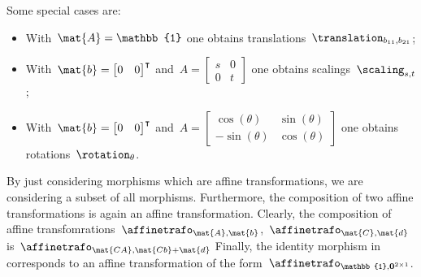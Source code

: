 \begin{solution}
\begin{itemize}
              Some special cases are:
              \begin{itemize}
                  \item With~$\mat{A}=\mathbb{1}$ one obtains translations~$\translation_{b_{11},b_{21}}$;
                  \item With~$\mat{b}=\begin{bmatrix}0&0\end{bmatrix}^\intercal$ and~$A=\begin{bmatrix} s&0\\0&t\end{bmatrix}$ one obtains scalings~$\scaling_{s,t}$;
                  \item With~$\mat{b}=\begin{bmatrix}0&0\end{bmatrix}^\intercal$ and~$A=\begin{bmatrix} \cos(\theta)&\sin(\theta)\\-\sin(\theta)&\cos(\theta)\end{bmatrix}$ one obtains rotations~$\rotation_{\theta}$.
              \end{itemize}
              By just considering morphisms which are affine transformations, we are considering a subset of all morphisms.
              Furthermore, the composition of two affine transformations is again an affine transformation.
              Clearly, the composition of affine transfomrations~$\affinetrafo_{\mat{A},\mat{b}}$,~$\affinetrafo_{\mat{C},\mat{d}}$ is~$\affinetrafo_{\mat{CA},\mat{Cb}+\mat{d}}$
              Finally, the identity morphism in \Draw corresponds to an affine transformation of the form~$\affinetrafo_{\mathbb{1},\mathbf{0}^{2\times 1}}$.
    \end{itemize}
\end{solution}

